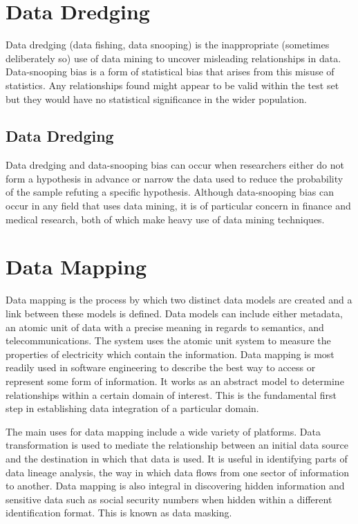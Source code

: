 \documentclass[11pt]{article} %
\begin{document}
\section{Data Dredging}

Data dredging (data fishing, data snooping) is the inappropriate (sometimes deliberately so) use of data mining to uncover misleading relationships in data. Data-snooping bias is a form of statistical bias that arises from this misuse of statistics. Any relationships found might appear to be valid within the test set but they would have no statistical significance in the wider population.
\subsection{Data Dredging}
Data dredging and data-snooping bias can occur when researchers either do not form a hypothesis in advance or narrow the data used to reduce the probability of the sample refuting a specific hypothesis. Although data-snooping bias can occur in any field that uses data mining, it is of particular concern in finance and medical research, both of which make heavy use of data mining techniques.
\newpage
\section{Data Mapping}
Data mapping is the process by which two distinct data models are created and a link between these models is defined. Data models can include either metadata, an atomic unit of data with a precise meaning in regards to semantics, and telecommunications. The system uses the atomic unit system to measure the properties of electricity which contain the information. Data mapping is most readily used in software engineering to describe the best way to access or represent some form of information. It works as an abstract model to determine relationships within a certain domain of interest. This is the fundamental first step in establishing data integration of a particular domain.

The main uses for data mapping include a wide variety of platforms. Data transformation is used to mediate the relationship between an initial data source and the destination in which that data is used. It is useful in identifying parts of data lineage analysis, the way in which data flows from one sector of information to another. Data mapping is also integral in discovering hidden information and sensitive data such as social security numbers when hidden within a different identification format. This is known as data masking.
\end{document}
